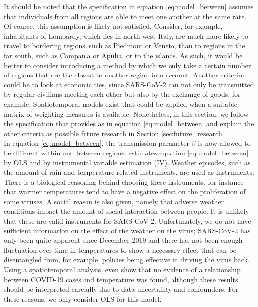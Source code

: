 \documentclass[12pt]{article}
\begin{document}
	It should be noted that the specification in equation \eqref{eq:model_between} assumes that individuals from all regions are able to meet one another at the same rate. Of course, this assumption is likely not satisfied. Consider, for example, inhabitants of Lombardy, which lies in north-west Italy, are much more likely to travel to bordering regions, such as Piedmont or Veneto, than to regions in the far south, such as Campania or Apulia, or to the islands. As such, it would be better to consider introducing a method by which we only take a certain number of regions that are the closest to another region into account. Another criterion could be to look at economic ties, since SARS-CoV-2 can not only be transmitted by regular civilians meeting each other but also by the exchange of goods, for example. Spatiotemporal models exist that could be applied when a suitable matrix of weighting measures is available. Nonetheless, in this section, we follow the specification that \textcite{adda2016economic} provides as in equation \eqref{eq:model_between} and explain the other criteria as possible future research in Section \ref{sec:future_research}. 
	\\
	
	
	In equation \eqref{eq:model_between}, the transmission parameter $\beta$ is now allowed to be different within and between regions. \textcite{adda2016economic} estimates equation \eqref{eq:model_between} by OLS and by instrumental variable estimation (IV). Weather episodes, such as the amount of rain and temperature-related instruments, are used as instruments. There is a biological reasoning behind choosing these instruments, for instance that warmer temperatures tend to have a negative effect on the proliferation of some viruses. A social reason is also given, namely that adverse weather conditions impact the amount of social interaction between people. It is unlikely that these are valid instruments for SARS-CoV-2. Unfortunately, we do not have sufficient information on the effect of the weather on the virus; SARS-CoV-2 has only been quite apparent since December 2019 and there has not been enough fluctuation over time in temperatures to show a necessary effect that can be disentangled from, for example, policies being effective in driving the virus back. Using a spatiotemporal analysis, \textcite{briz2020temperature} even show that no evidence of a relationship between COVID-19 cases and temperature was found, although these results should be interpreted carefully due to data uncertainty and confounders. For these reasons, we only consider OLS for this model. 
	\\
	
\end{document}
